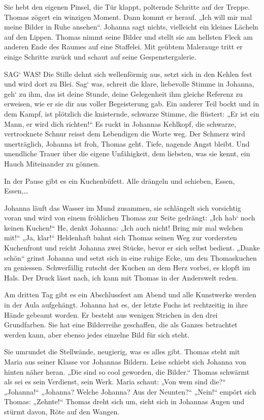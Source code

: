 \documentclass[10pt,titlepage,a5paper]{book}
\begin{document}
Sie hebt den eigenen Pinsel, die Tür klappt, polternde Schritte auf der Treppe. Thomas zögert ein winzigen Moment. Dann kommt er herauf. „Ich will mir mal meine Bilder in Ruhe ansehen“. Johanna sagt nichts, vielleicht ein kleines Lächeln auf den Lippen. Thomas nimmt seine Bilder und stellt sie am hellsten Fleck am anderen Ende des Raumes auf eine Staffelei. Mit geübtem Malerauge tritt er einige Schritte zurück und  schaut auf seine Gespenstergalerie.

SAG` WAS! Die Stille dehnt sich wellenförmig aus, setzt sich in den Kehlen fest und wird dort zu Blei. Sag` was, schreit die klare, liebevolle Stimme in Johanna, geh` zu ihm, das ist deine Stunde, deine Gelegenheit ihm gleiche Referenz zu erweisen, wie er sie dir aus voller Begeisterung gab.
Ein anderer Teil bockt und in dem Kampf, ist plötzlich die knisternde, schwarze Stimme, die flüstert: „Er ist ein Mann, er wird dich richten!“ Es ruckt in Johannas Kehlkopf, die schwarze, vertrocknete Schnur reisst dem Lebendigen die Worte weg. Der Schmerz wird unerträglich, Johanna ist froh, Thomas geht. Tiefe, nagende Angst bleibt. Und unendliche Trauer über die eigene Unfähigkeit, dem liebsten, was sie kennt, ein Hauch Miteinander zu gönnen.

In der Pause gibt es ein Kuchenbüfett. Alle drängeln und schieben, Essen, Essen,\dots 

Johanna läuft das Wasser im Mund zusammen, sie schlängelt sich vorsichtig voran und wird von einem fröhlichen Thomas zur Seite gedrängt: „Ich hab` noch keinen Kuchen!“ He, denkt Johanna: „Ich auch nicht! Bring mir mal welchen mit!“ „Ja, klar!“ Heldenhaft  bahnt sich Thomas seinen Weg zur vordersten Kuchenfront und reicht Johanna  zwei Stücke, bevor er sich selbst bedient. „Danke schön“ grinst Johanna und setzt sich in eine ruhige Ecke, um den Thomaskuchen zu geniessen. Schwerfällig rutscht der  Kuchen an dem Herz vorbei, es klopft im Hals. Der Druck lässt nach, ich kann mit Thomas in der Anderswelt reden.

Am dritten Tag gibt es ein Abschlussfest am Abend und alle Kunstwerke werden in der Aula aufgehängt. Johanna hat es, der letzte Fuchs ist rechtzeitig in ihre Hände gebeamt worden. Er besteht aus wenigen Strichen in den drei Grundfarben. Sie hat eine Bilderreihe geschaffen, die als Ganzes betrachtet werden kann, aber ebenso jedes einzelne Bild für sich steht.

Sie umrundet die Stellwände, neugierig, was es alles gibt. Thomas steht mit Maria aus seiner Klasse vor Johannas Bildern. Leise schiebt sich Johanna von hinten näher heran. „Die sind so cool geworden, die Bilder.“ Thomas schwärmt als sei es sein Verdienst, sein Werk. Maria schaut: „Von wem sind die?“ „Johanna!“ „Johanna? Welche Johanna? Aus der Neunten?“ „Nein!“ empört sich Thomas: „Zehnte!“ Thomas dreht sich um, sieht sich in Johannas Augen und stürmt davon, Röte auf den Wangen.
\end{document}
